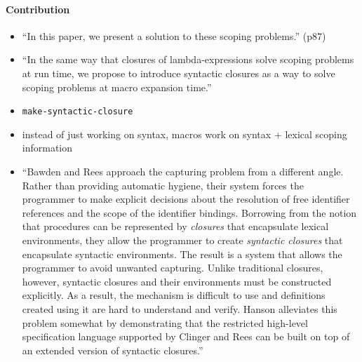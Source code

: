 \documentclass[12pt]{article}	%
\begin{document}
\paragraph{Contribution}
\begin{itemize}
	\item ``In this paper, we present a solution to these scoping problems.'' (p87)
	\item ``In the same way that closures of lambda-expressions solve scoping problems at run time, we propose to introduce syntactic closures as a way to solve scoping problems at macro expansion time.''
	\item \verb!make-syntactic-closure!
	\item instead of just working on syntax, macros work on syntax + lexical scoping information
	\item ``Bawden and Rees approach the capturing problem from a different angle. Rather than providing automatic hygiene, their system forces the programmer to make explicit decisions about the resolution of free identifier references and the scope of the identifier bindings. Borrowing from the notion that procedures can be represented by \textit{closures} that encapsulate lexical environments, they allow the programmer to create \textit{syntactic closures} that encapsulate syntactic environments. The result is a system that allows the programmer to avoid unwanted capturing. Unlike traditional closures, however, syntactic closures and their environments must be constructed explicitly. As a result, the mechanism is difficult to use and definitions created using it are hard to understand and verify. Hanson alleviates this problem somewhat by demonstrating that the restricted high-level specification language supported by Clinger and Rees can be built on top of an extended version of syntactic closures.''\cite[p298-299]{Dybvig1992Syntactic}
\end{itemize}
\end{document}
